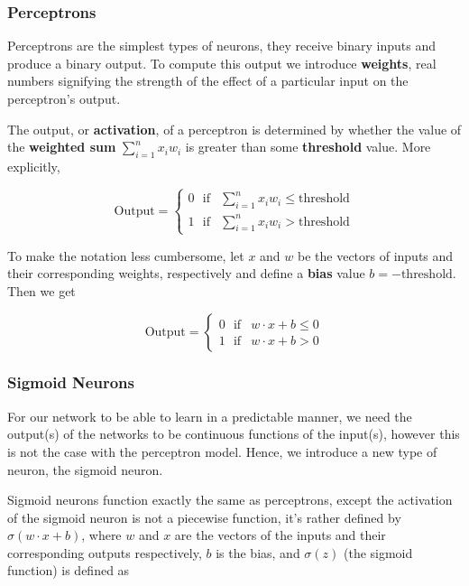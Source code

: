 \documentclass{article}
\begin{document}
\subsubsection{Perceptrons}
Perceptrons are the simplest types of neurons, they receive binary inputs and produce a binary output. To compute this output we introduce \textbf{weights}, real numbers signifying the strength of the effect of a particular input on the perceptron's output.


The output, or \textbf{activation}, of a perceptron is determined by whether the value of the \textbf{weighted sum} $\sum_{i=1}^{n}{x_{i}w_{i}}$ is greater than some \textbf{threshold} value. More explicitly,

\begin{equation}
\text{Output} =
\begin{cases} 
    0 \ \ \ \text{if} & \sum_{i=1}^{n}{x_{i}w_{i}} \le \text{threshold} \\
    1 \ \ \ \text{if} & \sum_{i=1}^{n}{x_{i}w_{i}} > \text{threshold}
\end{cases}
\end{equation}

To make the notation less cumbersome, let $x$ and $w$ be the vectors of inputs and their corresponding weights, respectively and define a \textbf{bias} value $b=-\text{threshold}$. Then we get

\begin{equation}
\text{Output} =
\begin{cases} 
    0 \ \ \ \text{if} & w \cdot x + b \le 0 \\
    1 \ \ \ \text{if} & w \cdot x + b > 0
\end{cases}
\end{equation}

\subsubsection{Sigmoid Neurons}

For our network to be able to learn in a predictable manner, we need the output(s) of the networks to be continuous functions of the input(s), however this is not the case with the perceptron model. Hence, we introduce a new type of neuron, the sigmoid neuron.

Sigmoid neurons function exactly the same as perceptrons, except the activation of the sigmoid neuron is not a piecewise function, it's rather defined by $\sigma(w \cdot x + b)$, where $w$ and $x$ are the vectors of the inputs and their corresponding outputs respectively, $b$ is the bias, and $\sigma(z)$ (the sigmoid function) is defined as
\end{document}
